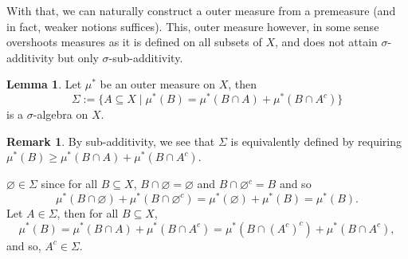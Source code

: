 \documentclass[
]{article}
\theoremstyle{definition}
\newtheorem*{remark}{Remark}
\theoremstyle{definition}
\newtheorem{lemma}{Lemma}[section]
\begin{document}
With that, we can naturally construct a outer measure from a premeasure
(and in fact, weaker notions suffices). This, outer measure however, in
some sense overshoots measures as it is defined on all subsets of \(X\),
and does not attain \(\sigma\)-additivity but only
\(\sigma\)-sub-additivity.

\begin{lemma}\label{cath_sig}
  Let \(\mu^*\) be an outer measure on \(X\), then 
  \[\Sigma := \{A \subseteq X \mid \mu^*(B) = \mu^*(B \cap A) + \mu^*(B \cap A^c)\}\]
  is a \(\sigma\)-algebra on \(X\).
\end{lemma}
\begin{remark}
  By sub-additivity, we see that \(\Sigma\) is equivalently defined by requiring 
  \(\mu^*(B) \ge \mu^*(B \cap A) + \mu^*(B \cap A^c)\).
\end{remark}
\proof

\(\varnothing \in \Sigma\) since for all \(B \subseteq X\),
\(B \cap \varnothing = \varnothing\) and \(B \cap \varnothing^c = B\)
and so \[\mu^*(B \cap \varnothing) + \mu^*(B \cap \varnothing^c) 
    = \mu^*(\varnothing) + \mu^*(B) = \mu^*(B).\] Let \(A \in \Sigma\),
then for all \(B \subseteq X\),
\[\mu^*(B) = \mu^*(B \cap A) + \mu^*(B \cap A^c) 
    = \mu^*(B \cap (A^c)^c) + \mu^*(B \cap A^c),\] and so,
\(A^c \in \Sigma\).
\end{document}
